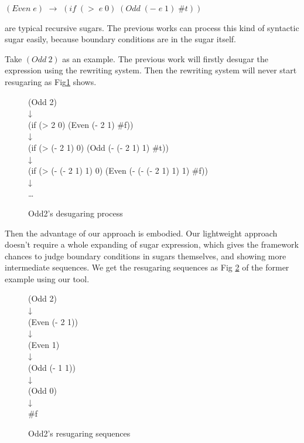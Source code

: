 $(Even\;e)$ $\rightarrow$ $(if\;(>\;e\;0)\;(Odd\;(-\;e\;1)\;\#t))$

are typical recursive sugars. The previous works can process this kind of syntactic sugar easily, because boundary conditions are in the sugar itself.

Take $(Odd~2)$ as an example. The previous work will firstly desugar the expression using the rewriting system. Then the rewriting system will never start resugaring as Fig\ref{fig:odd} shows.

\begin{figure}[ht]
	\centering
	\parbox[t]{\textwidth}{
				\begin{center}
				{
					\small\selectfont
					(Odd 2)\\
					↓\\
					(if (> 2 0) (Even (- 2 1) \#f))\\
					↓\\
					(if (> (- 2 1) 0) (Odd (- (- 2 1) 1) \#t))\\
					↓\\
					(if (> (- (- 2 1) 1) 0) (Even (- (- (- 2 1) 1) 1) \#f))\\
					↓\\
					{\ldots}
				}
				\end{center}
				
			}
	\caption{Odd2's desugaring process}
\label{fig:odd}
\end{figure}

Then the advantage of our approach is embodied. Our lightweight approach doesn't require a whole expanding of sugar expression, which gives the framework chances to judge boundary conditions in sugars themselves, and showing more intermediate sequences. We get the resugaring sequences as Fig \ref{fig:rec} of the former example using our tool.

\begin{figure}[ht]
	\centering
	\parbox[t]{\textwidth}{
				\begin{center}
				{
					\small\selectfont
					(Odd 2)\\
					↓\\
					(Even (- 2 1))\\
					↓\\
					(Even 1)\\
					↓\\
					(Odd (- 1 1))\\
					↓\\
					(Odd 0)\\
					↓\\
					\#f
				}
				\end{center}
				
			}
	\caption{Odd2's resugaring sequences}
\label{fig:rec}
\end{figure}


